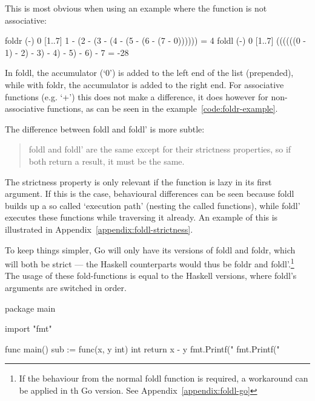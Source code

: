 This is most obvious when using an example where the function is not associative:

\begin{code}
    \label{code:foldr-example}
    \begin{haskellcode}
foldr (-) 0 [1..7]
1 - (2 - (3 - (4 - (5 - (6 - (7 - 0)))))) = 4
foldl (-) 0 [1..7]
((((((0 - 1) - 2) - 3) - 4) - 5) - 6) - 7 = -28
    \end{haskellcode}
\end{code}
In foldl, the accumulator (`0') is added to the left end of the list (prepended),
while with foldr, the accumulator is added to the right end.
For associative functions (e.g. `+') this does not make a difference, it does
however for non-associative functions, as can be seen in the example~\ref{code:foldr-example}.

The difference between foldl and foldl' is more subtle:
\begin{quote}
    foldl and foldl' are the same except for their strictness properties, so if both
    return a result, it must be the same.\autocite{fold-types}
\end{quote}

The strictness property is only relevant if the function is lazy in its first argument.
If this is the case, behavioural differences can be seen because foldl builds up a so
called `execution path' (nesting the called functions), while foldl' executes these
functions while traversing it already. An example of this is illustrated in
Appendix~\ref{appendix:foldl-strictness}.

To keep things simpler, Go will only have its versions of foldl and foldr, which
will both be strict --- the Haskell counterparts would thus be foldr and foldl'.\footnote{
If the behaviour from the normal foldl function is required, a workaround can
be applied in th Go version. See Appendix~\ref{appendix:foldl-go}}
The usage of these fold-functions is equal to the Haskell versions, where foldl's
arguments are switched in order.

\begin{code}
    \label{code:fold-go}
\begin{gocode}
package main

import "fmt"

func main() {
  sub := func(x, y int) int { return x - y }
  fmt.Printf("%
  fmt.Printf("%
}
\end{gocode}
\end{code}
